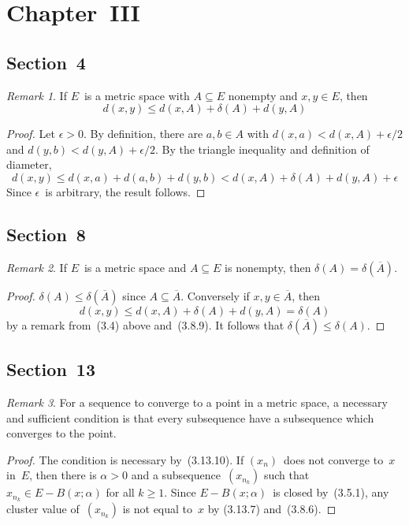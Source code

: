 \documentclass[letterpaper,12pt]{article}
\newcommand{\diam}{\delta}
\newcommand{\closure}[1]{\overline{#1}}
\theoremstyle{plain}
\theoremstyle{definition}
\theoremstyle{remark}
\newtheorem*{rmk}{Remark}
\begin{document}
\section*{Chapter~III}
\subsection*{Section~4}
\begin{rmk}
If \(E\)~is a metric space with \(A\subseteq E\) nonempty and \(x,y\in E\), then
\[d(x,y)\le d(x,A)+\diam(A)+d(y,A)\]
\end{rmk}
\begin{proof}
Let \(\epsilon>0\). By definition, there are \(a,b\in A\) with \(d(x,a)<d(x,A)+\epsilon/2\) and \(d(y,b)<d(y,A)+\epsilon/2\). By the triangle inequality and definition of diameter,
\[d(x,y)\le d(x,a)+d(a,b)+d(y,b)<d(x,A)+\diam(A)+d(y,A)+\epsilon\]
Since \(\epsilon\)~is arbitrary, the result follows.
\end{proof}

\subsection*{Section~8}
\begin{rmk}
If \(E\)~is a metric space and \(A\subseteq E\) is nonempty, then \(\diam(A)=\diam(\closure{A})\).
\end{rmk}
\begin{proof}
\(\diam(A)\le\diam(\closure{A})\) since \(A\subseteq\closure{A}\). Conversely if \(x,y\in\closure{A}\), then
\[d(x,y)\le d(x,A)+\diam(A)+d(y,A)=\diam(A)\]
by a remark from~(3.4) above and~(3.8.9). It follows that \(\diam(\closure{A})\le\diam(A)\).
\end{proof}

\subsection*{Section~13}
\begin{rmk}
For a sequence to converge to a point in a metric space, a necessary and sufficient condition is that every subsequence have a subsequence which converges to the point.
\end{rmk}
\begin{proof}
The condition is necessary by~(3.13.10). If \((x_n)\)~does not converge to~\(x\) in~\(E\), then there is \(\alpha>0\) and a subsequence~\((x_{n_k})\) such that \(x_{n_k}\in E-B(x;\alpha)\) for all \(k\ge 1\). Since \(E-B(x;\alpha)\)~is closed by~(3.5.1), any cluster value of~\((x_{n_k})\) is not equal to~\(x\) by (3.13.7) and~(3.8.6).
\end{proof}
\end{document}
